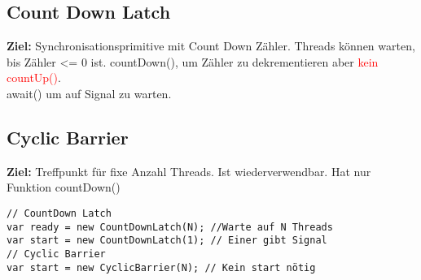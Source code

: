 \subsection{Count Down Latch}
\textcolor{b}{\textbf{Ziel:}} Synchronisationsprimitive mit Count Down Zähler. Threads können warten, bis Zähler <= 0 ist. \textcolor{b}{countDown()}, um Zähler zu dekrementieren aber \textcolor{red}{kein countUp()}.\\
\textcolor{b}{await()} um auf Signal zu warten.
\subsection{Cyclic Barrier}
\textcolor{b}{\textbf{Ziel:}} Treffpunkt für fixe Anzahl Threads. Ist wiederverwendbar. Hat nur Funktion \textcolor{b}{countDown()}
\begin{lstlisting}
// CountDown Latch
var ready = new CountDownLatch(N); //Warte auf N Threads
var start = new CountDownLatch(1); // Einer gibt Signal
// Cyclic Barrier
var start = new CyclicBarrier(N); // Kein start nötig
\end{lstlisting}